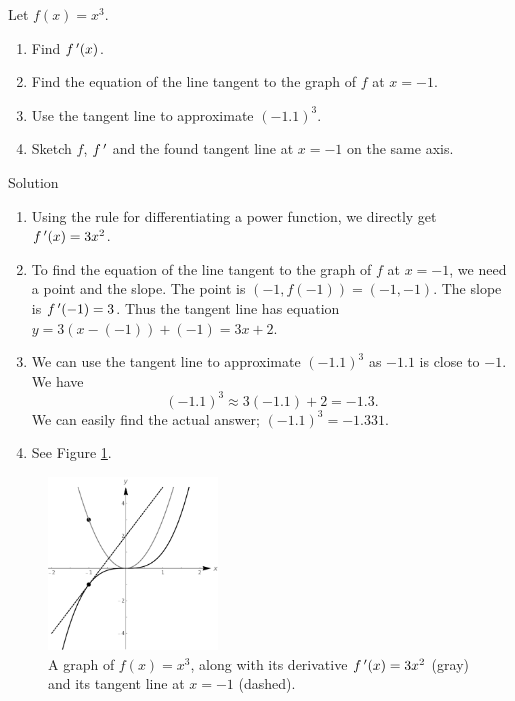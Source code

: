 \ifcalculus
\begin{example}\label{ex_deriv_rule1}
Let $f(x)=x^3$. 
		\begin{enumerate}
		\item		Find $f\,'(x)$.
		\item		Find the equation of the line tangent to the graph of $f$ at $x=-1$. 
		\item		Use the tangent line to approximate $(-1.1)^3$.
		\item		Sketch $f$, $f\,'$ and the found tangent line at $x=-1$ on the same axis.
		\end{enumerate}

\ifcalculus\pagebreak\fi
{}Solution 

\begin{enumerate}

		\item		Using the rule for differentiating a power function, we directly get $f\,'(x) = 3x^2$. 

		\item		To find the equation of the line tangent to the graph of $f$ at $x=-1$, we need a point and the slope. The point is $(-1,f(-1)) = (-1, -1)$. The slope is $f\,'(-1)= 3$. Thus the tangent line has equation $y = 3(x-(-1))+(-1) = 3x+2$. 
		
		\item		We can use the tangent line to approximate $(-1.1)^3$ as $-1.1$ is close to $-1$. We have $$(-1.1)^3 \approx 3(-1.1)+2 = -1.3.$$
			We can easily find the actual answer; $(-1.1)^3 = -1.331$. 
		
		\item		See Figure \ref{fig_diff_6}.
		\end{enumerate}
		
		\begin{figure}[H]
	\begin{center}
			\includegraphics[width=0.4\textwidth]{fig_diff_6}
	\caption{A graph of $f(x) = x^3$, along with its derivative $f\,'(x) = 3x^2$ (gray) and its tangent line at $x=-1$ (dashed).}
	\label{fig_diff_6}
	\end{center}
\end{figure}


\end{example}
\fi

